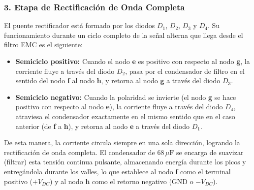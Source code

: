 \documentclass[12pt, a4paper]{article}
\begin{document}
\subsubsection*{3. Etapa de Rectificación de Onda Completa}
El puente rectificador está formado por los diodos $D_1$, $D_2$, $D_3$ y $D_4$. Su funcionamiento durante un ciclo completo de la señal alterna que llega desde el filtro EMC es el siguiente:
\begin{itemize}
    \item \textbf{Semiciclo positivo:} Cuando el nodo \textbf{e} es positivo con respecto al nodo \textbf{g}, la corriente fluye a través del diodo $D_2$, pasa por el condensador de filtro en el sentido del nodo \textbf{f} al nodo \textbf{h}, y retorna al nodo \textbf{g} a través del diodo $D_3$.
    \item \textbf{Semiciclo negativo:} Cuando la polaridad se invierte (el nodo \textbf{g} se hace positivo con respecto al nodo \textbf{e}), la corriente fluye a través del diodo $D_4$, atraviesa el condensador exactamente en el mismo sentido que en el caso anterior (de \textbf{f} a \textbf{h}), y retorna al nodo \textbf{e} a través del diodo $D_1$.
\end{itemize}
De esta manera, la corriente circula siempre en una sola dirección, logrando la rectificación de onda completa. El condensador de $68\,\mu\text{F}$ se encarga de suavizar (filtrar) esta tensión continua pulsante, almacenando energía durante los picos y entregándola durante los valles, lo que establece al nodo \textbf{f} como el terminal positivo ($+V_{DC}$) y al nodo \textbf{h} como el retorno negativo (GND o $-V_{DC}$).
\end{document}
